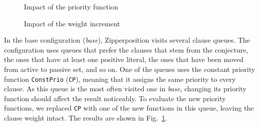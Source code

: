 \documentclass[smallcondensed,draft]{svjour3}     %
\begin{document}
\begin{figure}[t]
  \centering
  \caption{Impact of the priority function}
  \label{fig:priorities}
\end{figure}
\begin{figure}[t]
  \centering
  \def\arraystretch{1.1}%
  \caption{Impact of the  weight increment \ParamPenaltyIncrease}
  \label{fig:penalties}
\end{figure}

In the base configuration (\emph{base}), Zipperposition visits several clause
queues. The configuration uses queues that prefer the clauses that stem from
the conjecture, the ones that have at least one positive literal, the ones that
have been moved from active to passive set, and so on. One of the queues uses the constant
priority function \texttt{ConstPrio} (\texttt{CP}), meaning that it assigns the same
priority to every clause. As this queue is the most often visited one in \emph{base},
changing its priority function should affect the result noticeably.
To evaluate the new priority functions, we replaced
\texttt{CP} with one of the new functions in this queue,
leaving the clause weight intact. The results are shown in Fig.~\ref{fig:priorities}.
\end{document}
